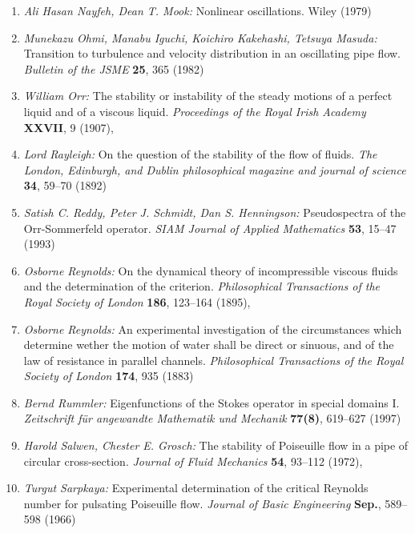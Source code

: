 \documentclass[10pt,a5paper,oneside,draft]{book}
\numberwithin{equation}{chapter}
\begin{document}
\begin{enumerate}
	\item \textsl{Ali Hasan Nayfeh, Dean T. Mook:} Nonlinear oscillations. Wiley (1979)\bibfill\pageref{bib:nayfeh_mook}
	\item \textsl{Munekazu Ohmi, Manabu Iguchi, Koichiro Kakehashi, Tetsuya Masuda:} Transition to turbulence and velocity distribution in an oscillating pipe flow. \textit{Bulletin of the JSME} \textbf{25}, 365 (1982)\bibfill\pageref{bib:ohmi_igushi}
	\item \textsl{William Orr:} The stability or instability of the steady motions of a perfect liquid and of a viscous liquid. \textit{Proceedings of the Royal Irish Academy} \textbf{XXVII}, 9 (1907)\bibfill\pageref{bib:orr},\,\pageref{bib:orr:2}
	\item \textsl{Lord Rayleigh:} On the question of the stability of the flow of fluids. \textit{The London, Edinburgh, and Dublin philosophical magazine and journal of science} \textbf{34}, 59--70 (1892)\bibfill\pageref{bib:rayleigh}
	\item \textsl{Satish C. Reddy, Peter J. Schmidt, Dan S. Henningson:} Pseudospectra of the {O}rr-{S}ommerfeld operator. \textit{SIAM Journal of Applied Mathematics} \textbf{53}, 15--47 (1993)\bibfill\pageref{bib:reddy}
	\item \textsl{Osborne Reynolds:} On the dynamical theory of incompressible viscous fluids and the determination of the criterion. \textit{Philosophical Transactions of the Royal Society of London} \textbf{186}, 123--164 (1895)\bibfill\pageref{bib:reynolds_criterion},\,\pageref{bib:reynolds_criterion:2}
	\item \textsl{Osborne Reynolds:} An experimental investigation of the circumstances which determine wether the motion of water shall be direct or sinuous, and of the law of resistance in parallel channels. \textit{Philosophical Transactions of the Royal Society of London} \textbf{174}, 935 (1883)\bibfill\pageref{bib:reynolds_experiment}
	\item \textsl{Bernd Rummler:} Eigenfunctions of the {S}tokes operator in special domains {I}. \textit{Zeitschrift f{\"u}r angewandte Mathematik und Mechanik} \textbf{77(8)}, 619--627 (1997)\bibfill\pageref{bib:rummler}
	\item \textsl{Harold Salwen, Chester E. Grosch:} The stability of {P}oiseuille flow in a pipe of circular cross-section. \textit{Journal of Fluid Mechanics} \textbf{54}, 93--112 (1972)\bibfill\pageref{bib:salwen_grosch},\,\pageref{bib:salwen_grosch:2}
	\item \textsl{Turgut Sarpkaya:} Experimental determination of the critical {R}eynolds number for pulsating {P}oiseuille flow. \textit{Journal of Basic Engineering} \textbf{Sep.}, 589--598 (1966)\bibfill\pageref{bib:sarpkaya}

\end{enumerate}
\end{document}
